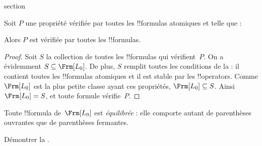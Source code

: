 \documentclass[11pt,a4paper,openany]{memoir}
\begin{document}
\endgroup



\begingroup
\expandafter\def\csname ol@sectioncs\endcsname{section}
\def\olfilename{preliminaries}




\begin{thm}
  Soit $P$ une propriété vérifiée par toutes les !!{formula}s atomiques
  et telle que :
  \begin{enumerate}
  \end{enumerate}
  Alors $P$ est vérifiée par toutes les !!{formula}s.
\end{thm}

\begin{proof}
  Soit $S$ la collection de toutes les !!{formula}s qui vérifient~$P$.
  On a évidemment $S \subseteq \Frm[L_0]$. De plus, $S$ remplit toutes
  les conditions de la  : il contient toutes
  les !!{formula}s atomiques et il est stable par les !!{operator}s.
  Comme $\Frm[L_0]$ est la plus petite classe ayant ces propriétés,
  $\Frm[L_0] \subseteq S$. Ainsi $\Frm[L_0] = S$, et toute formule
  vérifie~$P$.
\end{proof}

\begin{prop}
   Toute !!{formula} de~$\Frm[L_0]$ est \emph{équilibrée} :
   elle comporte autant de parenthèses ouvrantes que de parenthèses
   fermantes.
\end{prop}

\begin{prob}
Démontrer la .
\end{prob}
\end{document}
